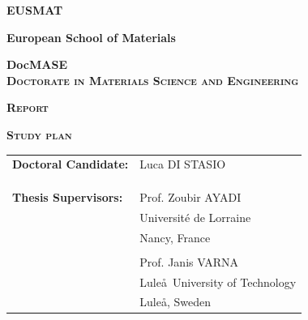 \documentclass[a4paper, twoside,12pt, abstract]{scrartcl} %
\begin{document}
\begin{center}

\vspace*{0.1cm}

\begin{Large}
\textbf{\textsc{EUSMAT}}\\[0.75ex]
\end{Large}

\begin{large}
\textbf{European School of Materials}\\[0.75ex]

\vspace*{1cm}

\textbf{DocMASE}\\[0.75ex]
\textbf{\textsc{Doctorate in Materials Science and Engineering}}
\end{large}

\vspace{2cm}

\begin{Large}
\textbf{\textsc{Report}}\\[0.75ex]
\end{Large}
\vspace*{0.5cm}

\begin{LARGE}
\textbf{\textsc{Study plan}}\\[0.75ex]
\end{LARGE}
\vspace*{2.5cm}

\begin{flushright}
\begin{tabular}{l l }
{\large \textbf{Doctoral Candidate:}} & {\large Luca DI STASIO}\\
&\\
&\\
&\\
{\large \textbf{Thesis Supervisors:}}& {\large Prof. Zoubir AYADI}\\
&{\large Universit\'e de Lorraine}\\
&{\large Nancy, France}\\
&\\
& {\large Prof. Janis VARNA}\\
&{\large Lule\aa\ University of Technology}\\
&{\large Lule\aa, Sweden}\\
\end{tabular}
\end{flushright}


\end{center}
\end{document}
